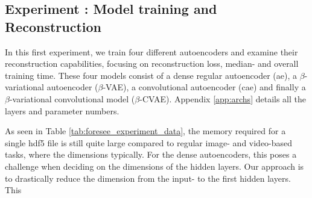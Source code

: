 \subsection{Experiment : Model training and Reconstruction}


In this first experiment, we train four different autoencoders and examine their reconstruction capabilities, focusing on reconstruction loss, median- and overall training time. These four models consist of a dense regular autoencoder (\acrshort{ae}), a $\beta$-variational autoencoder ($\beta$-VAE), a convolutional autoencoder (\acrshort{cae}) and finally a $\beta$-variational convolutional model ($\beta$-CVAE). Appendix \ref{app:archs} details all the layers and parameter numbers.

As seen in Table \ref{tab:foresee_experiment_data}, the memory required for a single \acrshort{hdf5} file is still quite large compared to regular image- and video-based tasks, where the dimensions typically. For the dense autoencoders, this poses a challenge when deciding on the dimensions of the hidden layers. Our approach is to drastically reduce the dimension from the input- to the first hidden layers. This 

